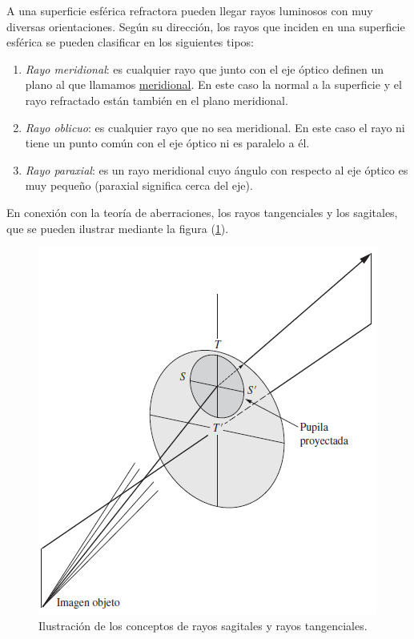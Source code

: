 \documentclass[14pt]{extarticle}
\begin{document}
A una superficie esférica refractora pueden llegar rayos luminosos con muy diversas orientaciones. Según su dirección, los rayos que inciden en una superficie esférica se pueden clasificar en los siguientes tipos:
\begin{enumerate}
\item \textit{Rayo meridional}: es cualquier rayo que junto con el eje óptico definen un plano al que llamamos \underline{meridional}. En este caso la normal a la superficie y el rayo refractado están también en el plano meridional.
\item \textit{Rayo oblicuo}: es cualquier rayo que no sea meridional. En este caso el rayo ni tiene un punto común con el eje óptico ni es paralelo a él.
\item \textit{Rayo paraxial}: es un rayo meridional cuyo ángulo con respecto al eje óptico es muy pequeño (paraxial significa cerca del eje).
\end{enumerate}
En conexión con la teoría de aberraciones, los rayos tangenciales y los sagitales, que se pueden ilustrar mediante la figura (\ref{fig:figura_11}).
\begin{figure}[H]
    \centering
    \includegraphics[scale=0.75]{Imagenes/Optica_Geometrica_07.png}
    \caption{Ilustración de los conceptos de rayos sagitales y rayos tangenciales.}
    \label{fig:figura_11}
\end{figure}
\end{document}
